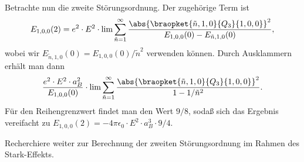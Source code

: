 \documentclass{subfiles}
\begin{document}
        Betrachte nun die zweite Störungsordnung. Der zugehörige Term ist
        \[
            E_{1,0,0}(2) = e^2\cdot E^2\cdot \lim\sum_{\tilde n = 1}^\infty\frac{\abs{\braopket{\tilde n,1,0}{Q_3}{1,0,0}}^2}{E_{1,0,0}(0) - E_{\tilde n,1,0}(0)},
        \]
        wobei wir $E_{\tilde n,1,0}(0) = E_{1,0,0}(0)/\tilde n^2$ verwenden können. Durch Ausklammern erhält man dann 
        \[
            \frac{e^2\cdot E^2\cdot a_B^2}{E_{1,0,0}(0)}\cdot\lim\sum_{\tilde n = 1}^\infty\frac{\abs{\braopket{\tilde n,1,0}{Q_3}{1,0,0}}^2}{1 - 1/\tilde n^2}.
        \]
        Für den Reihengrenzwert findet man den Wert $9 / 8$, sodaß sich das Ergebnis vereifacht zu $E_{1,0,0}(2) = -4\pi\epsilon_0\cdot E^2\cdot a_B^3\cdot 9/4$. 
        \begin{Aufgabe}
            \nr{} Recherchiere weiter zur Berechnung der zweiten Störungsordnung im Rahmen des Stark-Effekts.
        \end{Aufgabe}
\end{document}
